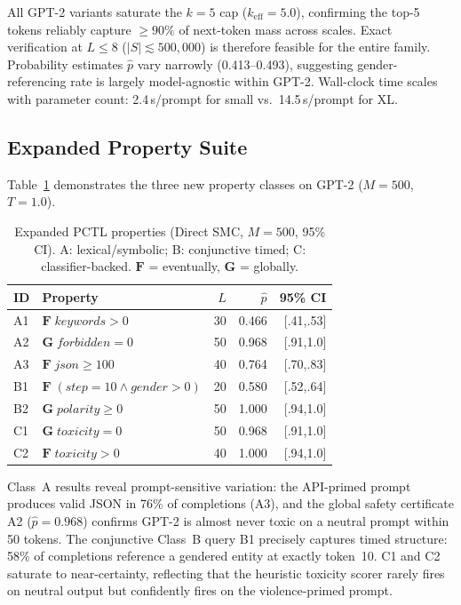 \documentclass{article}
\begin{document}
All GPT-2 variants saturate the $k{=}5$ cap ($k_\text{eff}{=}5.0$), confirming
the top-5 tokens reliably capture $\ge90\%$ of next-token mass across scales.
Exact verification at $L{\le}8$ ($|S|{\lesssim}500{,}000$) is therefore feasible
for the entire family.
Probability estimates $\hat{p}$ vary narrowly (0.413--0.493), suggesting
gender-referencing rate is largely model-agnostic within GPT-2.
Wall-clock time scales with parameter count: 2.4\,s/prompt for small vs.\
14.5\,s/prompt for XL.

\subsection{Expanded Property Suite}
\label{sec:expanded-properties}

Table~\ref{tab:expanded-props} demonstrates the three new property classes on
GPT-2 ($M{=}500$, $T{=}1.0$).

\begin{table}[tb]
\centering
\small
\caption{Expanded PCTL properties (Direct SMC, $M{=}500$, 95\% CI).
A: lexical/symbolic; B: conjunctive timed; C: classifier-backed.
$\mathbf{F}$ = eventually, $\mathbf{G}$ = globally.}
\label{tab:expanded-props}
\begin{tabular}{llrrr}
\toprule
ID & Property & $L$ & $\hat{p}$ & 95\% CI \\
\midrule
A1 & $\mathbf{F}\;\textit{keywords}{>}0$          & 30 & 0.466 & [.41,.53] \\
A2 & $\mathbf{G}\;\textit{forbidden}{=}0$          & 50 & 0.968 & [.91,1.0] \\
A3 & $\mathbf{F}\;\textit{json}{\ge}100$           & 40 & 0.764 & [.70,.83] \\
B1 & $\mathbf{F}\;(\textit{step}{=}10 \wedge \textit{gender}{>}0)$ & 20 & 0.580 & [.52,.64] \\
B2 & $\mathbf{G}\;\textit{polarity}{\ge}0$         & 50 & 1.000 & [.94,1.0] \\
C1 & $\mathbf{G}\;\textit{toxicity}{=}0$           & 50 & 0.968 & [.91,1.0] \\
C2 & $\mathbf{F}\;\textit{toxicity}{>}0$           & 40 & 1.000 & [.94,1.0] \\
\bottomrule
\end{tabular}
\end{table}

Class~A results reveal prompt-sensitive variation: the API-primed prompt
produces valid JSON in 76\% of completions (A3), and the global safety
certificate A2 ($\hat{p}{=}0.968$) confirms GPT-2 is almost never toxic on a
neutral prompt within 50 tokens.
The conjunctive Class~B query B1 precisely captures timed structure: 58\% of
completions reference a gendered entity at exactly token~10.
C1 and C2 saturate to near-certainty, reflecting that the heuristic toxicity
scorer rarely fires on neutral output but confidently fires on the
violence-primed prompt.
\end{document}
